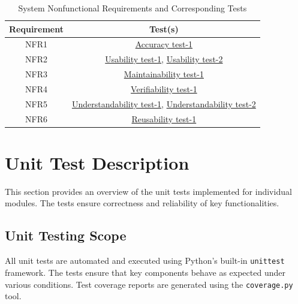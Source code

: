 \documentclass[12pt, titlepage]{article}
\begin{document}
\begin{table}[h!]
  \centering
    \begin{tabular}{|c|c|}
      \hline
      \textbf{Requirement} & \textbf{Test(s)} \\ \hline
      NFR1 & \textcolor{blue}{\hyperlink{Accuracy test-1}{Accuracy test-1}}  \\ \hline
      NFR2 & \textcolor{blue}{\hyperlink{Usability test-1}{Usability test-1}}, \textcolor{blue}{\hyperlink{Usability test-2}{Usability test-2}} \\ \hline
      NFR3 & \textcolor{blue}{\hyperlink{Maintainability test-1}{Maintainability test-1}}\\ \hline
      NFR4 & \textcolor{blue}{\hyperlink{Verifiability test-1}{Verifiability test-1}} \\ \hline
      NFR5 & \textcolor{blue}{\hyperlink{Understandability test-1}{Understandability test-1}}, \textcolor{blue}{\hyperlink{Understandability test-2}{Understandability test-2}} \\ \hline
      NFR6 & \textcolor{blue}{\hyperlink{Reusability test-1}{Reusability test-1}} \\ \hline
      \end{tabular}
      \caption{System Nonfunctional Requirements and Corresponding Tests}
      \label{tab:requirements_tests}
  \end{table}

\section{Unit Test Description}
This section provides an overview of the unit tests implemented for individual modules. The tests ensure correctness and reliability of key functionalities.


\subsection{Unit Testing Scope}
All unit tests are automated and executed using Python’s built-in \texttt{unittest} framework. The tests ensure that key components behave as expected under various conditions. Test coverage reports are generated using the \texttt{coverage.py} tool.
\end{document}
